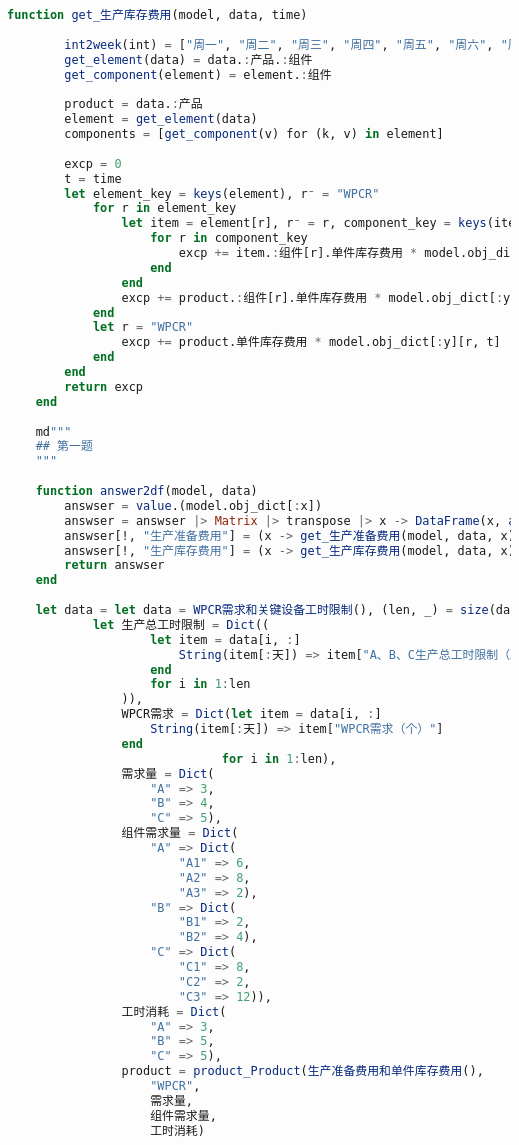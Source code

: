 \begin{appendices}
\begin{lstlisting}[language=julia]
    function get_生产库存费用(model, data, time)
    
        int2week(int) = ["周一", "周二", "周三", "周四", "周五", "周六", "周日"][int]
        get_element(data) = data.:产品.:组件
        get_component(element) = element.:组件
    
        product = data.:产品
        element = get_element(data)
        components = [get_component(v) for (k, v) in element]
    
        excp = 0
        t = time
        let element_key = keys(element), r⁻ = "WPCR"
            for r in element_key
                let item = element[r], r⁻ = r, component_key = keys(item.:组件)
                    for r in component_key
                        excp += item.:组件[r].单件库存费用 * model.obj_dict[:y][r, t]
                    end
                end
                excp += product.:组件[r].单件库存费用 * model.obj_dict[:y][r, t]
            end
            let r = "WPCR"
                excp += product.单件库存费用 * model.obj_dict[:y][r, t]
            end
        end
        return excp
    end
    
    md"""
    ## 第一题
    """
    
    function answer2df(model, data)
        answser = value.(model.obj_dict[:x])
        answser = answser |> Matrix |> transpose |> x -> DataFrame(x, axes(answser)[1])
        answser[!, "生产准备费用"] = (x -> get_生产准备费用(model, data, x)).([1, 2, 3, 4, 5, 6, 7]) .|> value
        answser[!, "生产库存费用"] = (x -> get_生产库存费用(model, data, x)).([1, 2, 3, 4, 5, 6, 7]) .|> value
        return answser
    end
    
    let data = let data = WPCR需求和关键设备工时限制(), (len, _) = size(data)
            let 生产总工时限制 = Dict((
                    let item = data[i, :]
                        String(item[:天]) => item["A、B、C生产总工时限制（工时）"]
                    end
                    for i in 1:len
                )),
                WPCR需求 = Dict(let item = data[i, :]
                    String(item[:天]) => item["WPCR需求（个）"]
                end
                              for i in 1:len),
                需求量 = Dict(
                    "A" => 3,
                    "B" => 4,
                    "C" => 5),
                组件需求量 = Dict(
                    "A" => Dict(
                        "A1" => 6,
                        "A2" => 8,
                        "A3" => 2),
                    "B" => Dict(
                        "B1" => 2,
                        "B2" => 4),
                    "C" => Dict(
                        "C1" => 8,
                        "C2" => 2,
                        "C3" => 12)),
                工时消耗 = Dict(
                    "A" => 3,
                    "B" => 5,
                    "C" => 5),
                product = product_Product(生产准备费用和单件库存费用(),
                    "WPCR",
                    需求量,
                    组件需求量,
                    工时消耗)
    

\end{lstlisting}
\end{appendices}
